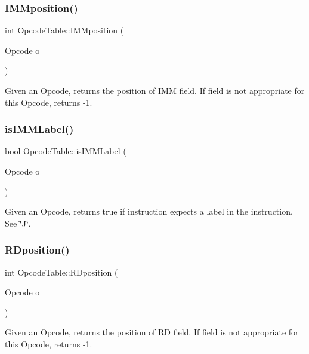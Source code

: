 \subsubsection{\texorpdfstring{I\+M\+Mposition()}{IMMposition()}}
{\footnotesize\ttfamily int Opcode\+Table\+::\+I\+M\+Mposition (\begin{DoxyParamCaption}\item[{Opcode}]{o }\end{DoxyParamCaption})}

Given an Opcode, returns the position of I\+MM field. If field is not appropriate for this Opcode, returns -\/1. \mbox{\label{class_opcode_table_a5ef810fba22c54758dd69b09e8bfae8c}} 
\subsubsection{\texorpdfstring{is\+I\+M\+M\+Label()}{isIMMLabel()}}
{\footnotesize\ttfamily bool Opcode\+Table\+::is\+I\+M\+M\+Label (\begin{DoxyParamCaption}\item[{Opcode}]{o }\end{DoxyParamCaption})}

Given an Opcode, returns true if instruction expects a label in the instruction. See \char`\"{}\+J\char`\"{}. \mbox{\label{class_opcode_table_ada77e4c8328f3a2730fc0974899da28f}} 
\subsubsection{\texorpdfstring{R\+Dposition()}{RDposition()}}
{\footnotesize\ttfamily int Opcode\+Table\+::\+R\+Dposition (\begin{DoxyParamCaption}\item[{Opcode}]{o }\end{DoxyParamCaption})}

Given an Opcode, returns the position of RD field. If field is not appropriate for this Opcode, returns -\/1. \mbox{\label{class_opcode_table_a6a2b017eeb7cfbc1bf614f52293c5ad4}} 
